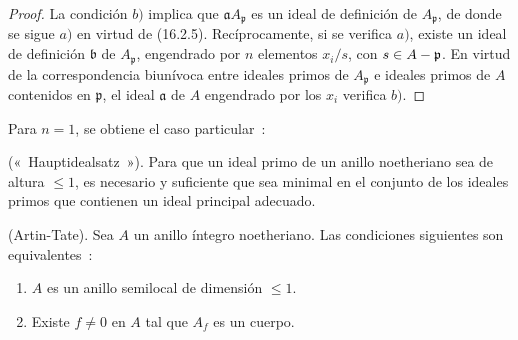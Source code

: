\begin{proof}
La condición $b)$ implica que $\mathfrak{a}A_{\mathfrak{p}}$ es un ideal de
definición de $A_{\mathfrak{p}}$, de donde se sigue $a)$ en virtud de (16.2.5).
Recíprocamente, si se verifica $a)$, existe un ideal de definición
$\mathfrak{b}$ de $A_{\mathfrak{p}}$, engendrado por $n$ elementos $x_i/s$, con
$s\in A-\mathfrak{p}$. En virtud de la correspondencia biunívoca entre ideales
primos de $A_{\mathfrak{p}}$ e ideales primos de $A$ contenidos en
$\mathfrak{p}$, el ideal $\mathfrak{a}$ de $A$ engendrado por los $x_i$ verifica
$b)$.
\end{proof}


Para $n=1$, se obtiene el caso particular~:

\begin{corollary}[16.3.2]
\label{0.16.3.2-fr}
\textup{(«~Hauptidealsatz~»).}
Para que un ideal primo de un anillo noetheriano sea de altura $\leq1$, es
necesario y suficiente que sea minimal en el conjunto de los ideales primos que
contienen un ideal principal adecuado.
\end{corollary}

\begin{corollary}[16.3.3]
\label{0.16.3.3-fr}
\textup{(Artin-Tate).}
Sea $A$ un anillo íntegro noetheriano. Las condiciones siguientes son
equivalentes~:
\begin{enumerate}
  \item[\textup{a)}] $A$ es un anillo semilocal de dimensión $\leq1$.
  \item[\textup{b)}] Existe $f\neq0$ en $A$ tal que $A_f$ es un cuerpo.
\end{enumerate}
\end{corollary}

